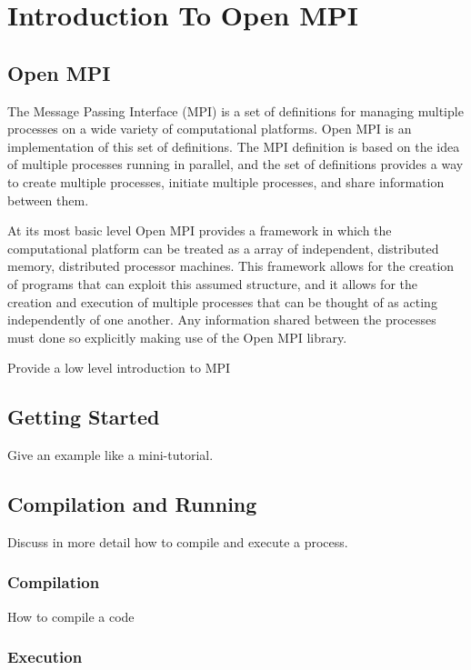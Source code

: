 
\chapter{Introduction To Open MPI}

\section{Open MPI}

The Message Passing Interface (MPI) is a set of definitions for
managing multiple processes on a wide variety of computational
platforms. Open MPI is an implementation of this set of definitions.
The MPI definition is based on the idea of multiple processes running
in parallel, and the set of definitions provides a way to create
multiple processes, initiate multiple processes, and share information
between them.

At its most basic level Open MPI provides a framework in which the
computational platform can be treated as a array of independent,
distributed memory, distributed processor machines. This framework
allows for the creation of programs that can exploit this assumed
structure, and it allows for the creation and execution of multiple
processes that can be thought of as acting independently of one
another.  Any information shared between the processes must done so
explicitly making use of the Open MPI library.

Provide a low level introduction to MPI

\section{Getting Started}

Give an example like a mini-tutorial.

\section{Compilation and Running}

Discuss in more detail how to compile and execute a process. 

\subsection{Compilation}

How to compile a code

\subsection{Execution}

